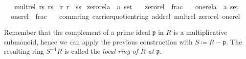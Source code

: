 \documentclass[12pt]{scrartcl}
\begin{document}
\begin{isabelle}
\ \ \ {\isachardoublequoteopen}mult{\isacharunderscore}{\kern0pt}rel\ {\isacharparenleft}{\kern0pt}r{\isacharslash}{\kern0pt}s{\isacharparenright}{\kern0pt}\ {\isacharparenleft}{\kern0pt}r{\isacharprime}{\kern0pt}{\isacharslash}{\kern0pt}s{\isacharprime}{\kern0pt}{\isacharparenright}{\kern0pt}\ {\isacharequal}{\kern0pt}\ {\isacharparenleft}{\kern0pt}r{\isasymcdot}\ r{\isacharprime}{\kern0pt}{\isacharparenright}{\kern0pt}\ {\isacharslash}{\kern0pt}\ {\isacharparenleft}{\kern0pt}s{\isasymcdot}s{\isacharprime}{\kern0pt}{\isacharparenright}{\kern0pt}{\isachardoublequoteclose}
\isanewline
\isanewline
{}\isamarkupfalse%
\ zero{\isacharunderscore}{\kern0pt}rel{\isacharcolon}{\kern0pt}{\isacharcolon}{\kern0pt}{\isachardoublequoteopen}{\isacharparenleft}{\kern0pt}{\isacharprime}{\kern0pt}a\ {\isasymtimes}\ {\isacharprime}{\kern0pt}a{\isacharparenright}{\kern0pt}\ set{\isachardoublequoteclose}\ \isanewline
\ \ {\isachardoublequoteopen}zero{\isacharunderscore}{\kern0pt}rel\ {\isacharequal}{\kern0pt}\ frac\ {\isasymzero}\ {\isasymone}{\isachardoublequoteclose}\isanewline
\isanewline
{}\isamarkupfalse%
\ one{\isacharunderscore}{\kern0pt}rel{\isacharcolon}{\kern0pt}{\isacharcolon}{\kern0pt}{\isachardoublequoteopen}{\isacharparenleft}{\kern0pt}{\isacharprime}{\kern0pt}a\ {\isasymtimes}\ {\isacharprime}{\kern0pt}a{\isacharparenright}{\kern0pt}\ set{\isachardoublequoteclose}\ \isanewline
\ \ {\isachardoublequoteopen}one{\isacharunderscore}{\kern0pt}rel\ {\isacharequal}{\kern0pt}\ frac\ {\isasymone}\ {\isasymone}{\isachardoublequoteclose}\isanewline
\isanewline
{}\isamarkupfalse%
\ comm{\isacharunderscore}{\kern0pt}ring\ carrier{\isacharunderscore}{\kern0pt}quotient{\isacharunderscore}{\kern0pt}ring\ add{\isacharunderscore}{\kern0pt}rel\ mult{\isacharunderscore}{\kern0pt}rel\ zero{\isacharunderscore}{\kern0pt}rel\ one{\isacharunderscore}{\kern0pt}rel\isanewline
\isanewline
{}
\end{isabelle}

Remember that the complement of a prime ideal $\mathfrak{p}$ in $R$ is a multiplicative submonoid, hence we can apply the previous construction with $S \coloneqq R - \mathfrak{p}$. The resulting ring  $S^{-1} R$ is called the \emph{local ring of $R$ at $\mathfrak{p}$}. \\

\end{document}
